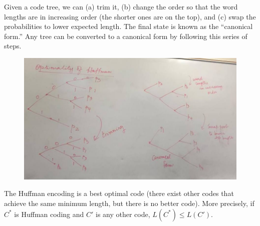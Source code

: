 \documentclass[11pt]{article}
\theoremstyle{definition}
\begin{document}
Given a code tree, we can (a) trim it, (b) change the order so that the word lengths are in increasing order (the shorter ones are on the top), and (c) swap the probabilities to lower expected length. The final state is known as the ``canonical form.'' Any tree can be converted to a canonical form by following this series of steps. 

\begin{figure}[h]
\centering
\includegraphics[width = \textwidth]{canonicalform.jpg}
\end{figure}
\theorem The Huffman encoding is a best optimal code (there exist other codes that achieve the same minimum length, but there is no better code). More precisely, if $C^*$ is Huffman coding and $C'$ is any other code, $L(C^*) \leq L(C')$. 
\end{document}
